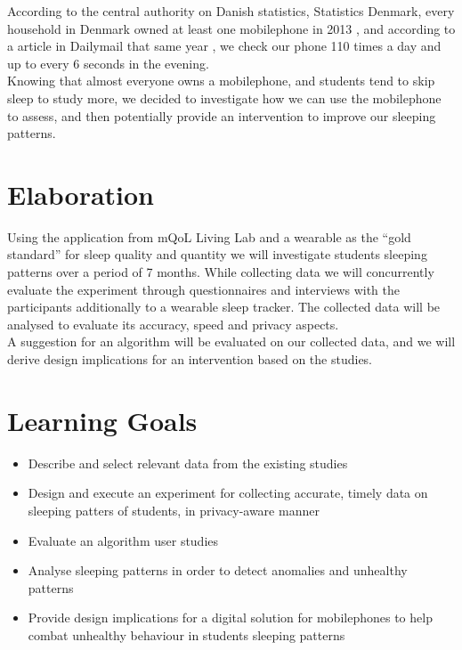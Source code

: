 \documentclass[12pt]{article}
\begin{document}
According to the central authority on Danish statistics, Statistics Denmark, every household in 
Denmark owned at least one mobilephone in 2013 \cite{DanmarksStatistik2013}, and according 
to a article in Dailymail that same year \cite{Woollaston2013}, we check our phone 110 times a 
day and up to every 6 seconds in the evening. \\

Knowing that almost everyone owns a mobilephone, and students tend to skip sleep to study more,
we decided to investigate how we can use the mobilephone to assess, and then potentially provide an intervention to improve our sleeping patterns. 

\section{Elaboration}
Using the application from mQoL Living Lab and a wearable as the ``gold standard'' for sleep quality and quantity we will investigate students sleeping patterns over a period of 7 months. While collecting data we will concurrently evaluate the experiment through questionnaires and interviews with the participants additionally to a wearable sleep tracker. The collected data will be analysed to evaluate its accuracy, speed and privacy aspects. \\

A suggestion for an algorithm will be evaluated on our collected data, and we will derive design implications for an intervention based on the studies. 

\section{Learning Goals}
	\begin{itemize}
		\item Describe and select relevant data from the existing studies
		\item Design and execute an experiment for collecting accurate, timely data on sleeping patters of students, in privacy-aware manner
		\item Evaluate an algorithm user studies
		\item Analyse sleeping patterns in order to detect anomalies and unhealthy patterns 
		\item Provide design implications for a digital solution for mobilephones to help combat unhealthy behaviour in students sleeping patterns
	\end{itemize}
	
\end{document}
